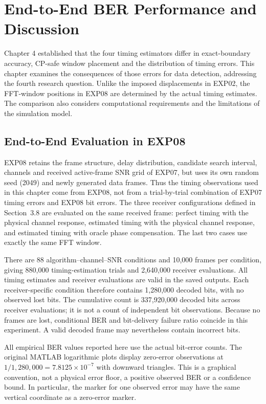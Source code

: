 \chapter[BER Performance and Discussion]{End-to-End BER Performance and Discussion}
\label{chap:ber_results}

Chapter 4 established that the four timing estimators differ in exact-boundary accuracy, CP-safe window placement and the distribution of timing errors. This chapter examines the consequences of those errors for data detection, addressing the fourth research question. Unlike the imposed displacements in EXP02, the FFT-window positions in EXP08 are determined by the actual timing estimates. The comparison also considers computational requirements and the limitations of the simulation model.

\section[EXP08 Evaluation]{End-to-End Evaluation in EXP08}
EXP08 retains the frame structure, delay distribution, candidate search interval, channels and received active-frame SNR grid of EXP07, but uses its own random seed (2049) and newly generated data frames. Thus the timing observations used in this chapter come from EXP08, not from a trial-by-trial combination of EXP07 timing errors and EXP08 bit errors. The three receiver configurations defined in Section~3.8 are evaluated on the same received frame: perfect timing with the physical channel response, estimated timing with the physical channel response, and estimated timing with oracle phase compensation. The last two cases use exactly the same FFT window.

There are 88 algorithm--channel--SNR conditions and 10,000 frames per condition, giving 880,000 timing-estimation trials and 2,640,000 receiver evaluations. All timing estimates and receiver evaluations are valid in the saved outputs. Each receiver-specific condition therefore contains 1,280,000 decoded bits, with no observed lost bits. The cumulative count is 337,920,000 decoded bits across receiver evaluations; it is not a count of independent bit observations. Because no frames are lost, conditional BER and bit-delivery failure ratio coincide in this experiment. A valid decoded frame may nevertheless contain incorrect bits.

All empirical BER values reported here use the actual bit-error counts. The original MATLAB logarithmic plots display zero-error observations at $1/1{,}280{,}000=7.8125\times10^{-7}$ with downward triangles. This is a graphical convention, not a physical error floor, a positive observed BER or a confidence bound. In particular, the marker for one observed error may have the same vertical coordinate as a zero-error marker.

